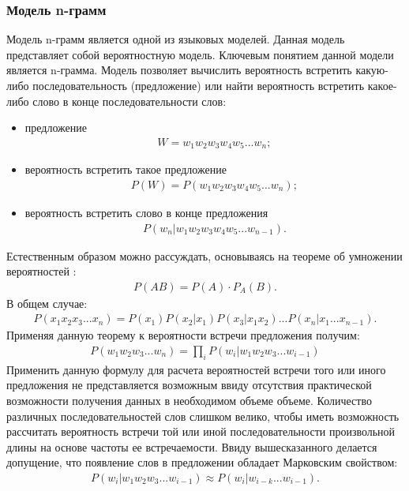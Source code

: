\subsubsection{Модель n-грамм}
Модель n-грамм является одной из языковых моделей. Данная модель представляет собой вероятностную модель. Ключевым понятием данной модели является n-грамма. Модель позволяет вычислить вероятность встретить какую-либо последовательность (предложение) или найти вероятность встретить какое-либо слово в конце последовательности слов:
\begin{itemize}
	\item
	предложение
	\begin{align}
		W = w_1w_2w_3w_4w_5...w_n;
	\end{align}
	\item
	вероятность встретить такое предложение
	\begin{align}
		P(W) = P(w_1w_2w_3w_4w_5...w_n);
	\end{align}
	\item
	вероятность встретить слово в конце предложения
	\begin{align}
		P(w_n|w_1w_2w_3w_4w_5...w_{n-1}).
	\end{align}
\end{itemize}
Естественным образом можно рассуждать, основываясь на теореме об умножении вероятностей \cite{gmurman}:
\begin{align}
	P(AB) = P(A) \cdot P_A(B).
\end{align}
В общем случае:
\begin{align}
	P(x_1x_2x_3...x_n) = P(x_1)P(x_2|x_1)P(x_3|x_1x_2)...P(x_n|x_1...x_{n-1}).
\end{align}
Применяя данную теорему к вероятности встречи предложения получим:
\begin{align}
	P(w_1w_2w_3...w_n) = \prod_{i}P(w_i|w_1w_2w_3...w_{i-1})
\end{align}
Применить данную формулу для расчета вероятностей встречи того или иного предложения не представляется возможным ввиду отсутствия практической возможности получения данных в необходимом объеме объеме. Количество различных последовательностей слов слишком велико, чтобы иметь возможность рассчитать вероятность встречи той или иной последовательности произвольной длины на основе частоты ее встречаемости. Ввиду вышесказанного делается допущение, что появление слов в предложении обладает Марковским свойством:
\begin{align}
	P(w_i|w_1w_2w_3...w_{i-1}) \approx P(w_i|w_{i-k}...w_{i-1}).
\end{align}
